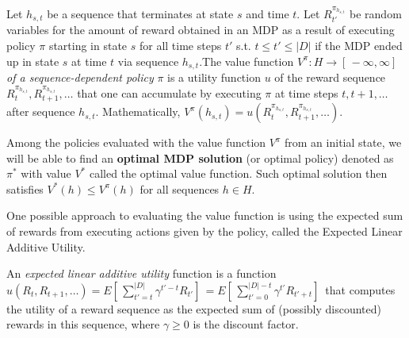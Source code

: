 

\begin{definition}
Let $h_{s,t}$ be a sequence that terminates at state $s$ and time $t$. Let $R^{\pi_{h_{s,t}}}_{t'}$ be random variables for the amount of reward obtained in an MDP as a result of executing policy $\pi$ starting in state $s$ for all time steps $t'$ s.t. $t \leqslant t' \leqslant |D|$ if the MDP ended up in state $s$ at time $t$ via sequence $h_{s,t}$.The value function $V^{\pi}: H \rightarrow [ \,−\infty,\infty] \,$ \textit{of a sequence-dependent policy} $\pi$ is a utility function $u$ of the reward sequence $R^{\pi_{h_{s,t}}}_t, R^{\pi_{h_{s,t}}}_{t+1}, \ldots$ that one can accumulate by executing $\pi$ at time steps $t, t + 1,\ldots$  after sequence $h_{s,t}$. Mathematically, $V^{\pi} (h_{s,t}) = u(R^{\pi_{h_{s,t}}}_t , R^{\pi_{h_{s,t}}}_{t+1}, \ldots)$.
\end{definition}


Among the policies evaluated with the value function $V^{\pi}$ from an initial state, we will be able to find an \textbf{optimal MDP solution} (or optimal policy) denoted as $\pi^*$ with value $V^*$ called the optimal value function. Such optimal solution then satisfies $V^{*} (h) \leqslant V^{\pi} (h)$ for all sequences $h \in H$.


One possible approach to evaluating the value function is using the expected sum of rewards from executing actions given by the policy, called the Expected Linear Additive Utility.
\\
\begin{definition}
An \textit{expected linear additive utility} function is a function $u(R_t, R_{t+1}, \ldots) = E[ \,\sum_{t'=t}^{|D|} \gamma ^{t'−t} R_{t'}] \, = E[ \,\sum_{t'=0}^{|D|-t} \gamma^{t'} R_{t'+t}] \,$ that computes the utility of a
reward sequence as the expected sum of (possibly discounted) rewards in this sequence, where $\gamma \geqslant 0$
is the discount factor.
\end{definition}

